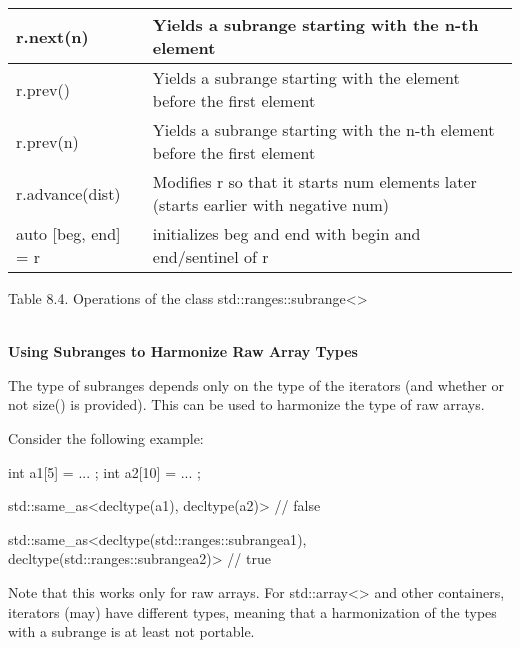 \begin{table}[H]
\begin{tabular}{|l|l|}
	r.next(n)               & Yields a subrange starting with the n-th element                          \\ \hline
	r.prev()                & Yields a subrange starting with the element before the first element      \\ \hline
	r.prev(n)               & Yields a subrange starting with the n-th element before the first element \\ \hline
	r.advance(dist)                & Modifies r so that it starts num elements later (starts earlier with negative num)                       \\ \hline
	auto {[}beg, end{]} = r & initializes beg and end with begin and end/sentinel of r                  \\ \hline
\end{tabular}
\end{table}

\begin{center}
Table 8.4. Operations of the class std::ranges::subrange<>
\end{center}

\noindent
\hspace*{\fill} \\ %
\textbf{Using Subranges to Harmonize Raw Array Types}

The type of subranges depends only on the type of the iterators (and whether or not size() is provided).
This can be used to harmonize the type of raw arrays.

Consider the following example:

\begin{cpp}
int a1[5] = { ... };
int a2[10] = { ... };

std::same_as<decltype(a1), decltype(a2)> // false

std::same_as<decltype(std::ranges::subrange{a1}),
			 decltype(std::ranges::subrange{a2})> // true
\end{cpp}

Note that this works only for raw arrays. For std::array<> and other containers, iterators (may) have different types, meaning that a harmonization of the types with a subrange is at least not portable.


